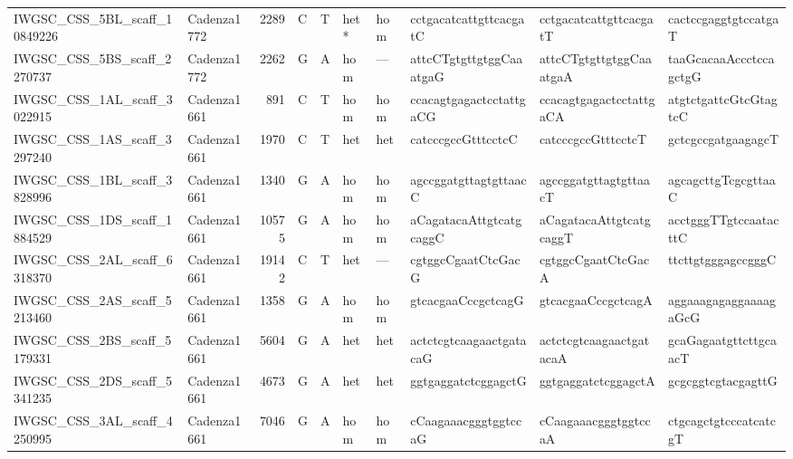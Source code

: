 \begin{longtable}{llrlllllll}
 IWGSC\_CSS\_5BL\_scaff\_10849226 & Cadenza1772 &       2289 & C         & T        & het*           & hom         & cctgacatcattgttcacgatC    & cctgacatcattgttcacgatT    & cactccgaggtgtccatgaT      \\
 IWGSC\_CSS\_5BS\_scaff\_2270737  & Cadenza1772 &       2262 & G         & A        & hom            & ---         & attcCTgtgttgtggCaaatgaG   & attcCTgtgttgtggCaaatgaA   & taaGcacaaAccctccagctgG    \\
 IWGSC\_CSS\_1AL\_scaff\_3022915  & Cadenza1661 &        891 & C         & T        & hom            & hom         & ccacagtgagactcctattgaCG   & ccacagtgagactcctattgaCA   & atgtctgattcGtcGtagtcC     \\
 IWGSC\_CSS\_1AS\_scaff\_3297240  & Cadenza1661 &       1970 & C         & T        & het            & het         & catcccgccGtttcctcC        & catcccgccGtttcctcT        & gctcgccgatgaagagcT        \\
 IWGSC\_CSS\_1BL\_scaff\_3828996  & Cadenza1661 &       1340 & G         & A        & hom            & hom         & agccggatgttagtgttaacC     & agccggatgttagtgttaacT     & agcagcttgTcgcgttaaC       \\
 IWGSC\_CSS\_1DS\_scaff\_1884529  & Cadenza1661 &      10575 & G         & A        & hom            & hom         & aCagatacaAttgtcatgcaggC   & aCagatacaAttgtcatgcaggT   & acctgggTTgtccaatacttC     \\
 IWGSC\_CSS\_2AL\_scaff\_6318370  & Cadenza1661 &      19142 & C         & T        & het            & ---         & cgtggcCgaatCtcGacG        & cgtggcCgaatCtcGacA        & ttcttgtgggagccgggC        \\
 IWGSC\_CSS\_2AS\_scaff\_5213460  & Cadenza1661 &       1358 & G         & A        & hom            & hom         & gtcacgaaCccgctcagG        & gtcacgaaCccgctcagA        & aggaaagagaggaaaagaGcG     \\
 IWGSC\_CSS\_2BS\_scaff\_5179331  & Cadenza1661 &       5604 & G         & A        & het            & het         & actctcgtcaagaactgatacaG   & actctcgtcaagaactgatacaA   & gcaGagaatgttcttgcaacT     \\
 IWGSC\_CSS\_2DS\_scaff\_5341235  & Cadenza1661 &       4673 & G         & A        & het            & het         & ggtgaggatctcggagctG       & ggtgaggatctcggagctA       & gcgcggtcgtacgagttG        \\
 IWGSC\_CSS\_3AL\_scaff\_4250995  & Cadenza1661 &       7046 & G         & A        & hom            & hom         & cCaagaaacgggtggtccaG      & cCaagaaacgggtggtccaA      & ctgcagctgtcccatcatcgT     \\

\end{longtable}
